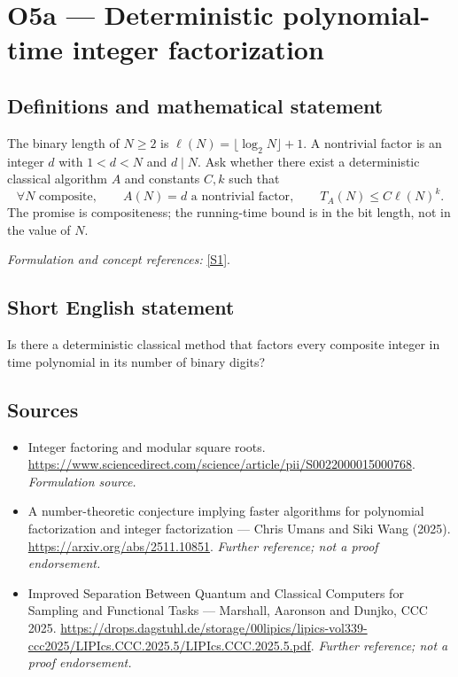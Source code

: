\documentclass[11pt]{article}
\begin{document}
\section*{\texorpdfstring{O5a — Deterministic polynomial-time integer factorization}{O5a — Deterministic polynomial-time integer factorization}}\label{8400004}
\subsection{Definitions and mathematical statement}
The binary length of $N\ge2$ is $\ell(N)=\lfloor\log_2N\rfloor+1$. A nontrivial factor is an integer $d$ with $1<d<N$ and $d\mid N$. Ask whether there exist a deterministic classical algorithm $A$ and constants $C,k$ such that
\[
 \forall N\text{ composite},\qquad A(N)=d\text{ a nontrivial factor},\qquad
 T_A(N)\le C\ell(N)^k.
\]
The promise is compositeness; the running-time bound is in the bit length, not in the value of $N$.
\par\smallskip\textit{Formulation and concept references:} \href{https://www.sciencedirect.com/science/article/pii/S0022000015000768}{[S1]}.

\subsection{Short English statement}
Is there a deterministic classical method that factors every composite integer in time polynomial in its number of binary digits?
\subsection{Sources}
\begin{itemize}
\item[S1]Integer factoring and modular square roots.
\url{https://www.sciencedirect.com/science/article/pii/S0022000015000768}.
\textit{Formulation source.}
\item[S2]A number-theoretic conjecture implying faster algorithms for polynomial factorization and integer factorization — Chris Umans and Siki Wang (2025).
\url{https://arxiv.org/abs/2511.10851}.
\textit{Further reference; not a proof endorsement.}
\item[S3]Improved Separation Between Quantum and Classical Computers for Sampling and Functional Tasks — Marshall, Aaronson and Dunjko, CCC 2025.
\url{https://drops.dagstuhl.de/storage/00lipics/lipics-vol339-ccc2025/LIPIcs.CCC.2025.5/LIPIcs.CCC.2025.5.pdf}.
\textit{Further reference; not a proof endorsement.}
\end{itemize}
\end{document}
